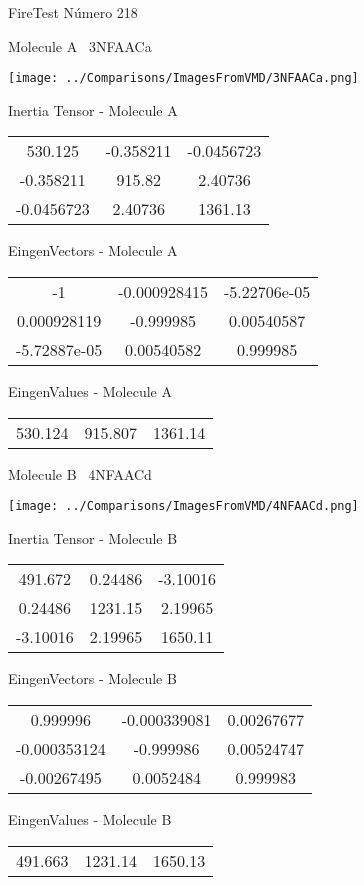 \vtab[-3cm]
\begin{center}
{\large FireTest \tab Número 218}
\end{center}
\begin{multicols}{2}
\begin{center}

Molecule A \
3NFAACa

\texttt{[image: ../Comparisons/ImagesFromVMD/3NFAACa.png]}

Inertia Tensor - Molecule A \\
\begin{tabular}{|c c c|}
530.125	 & 	-0.358211	 & 	-0.0456723	 \\
-0.358211	 & 	915.82	 & 	2.40736	 \\
-0.0456723	 & 	2.40736	 & 	1361.13
\end{tabular}

\vtab
 EingenVectors - Molecule A     \\
\begin{tabular}{|c c c|}
-1	 & 	-0.000928415	 & 	-5.22706e-05	 \\
0.000928119	 & 	-0.999985	 & 	0.00540587	 \\
-5.72887e-05	 & 	0.00540582	 & 	0.999985
\end{tabular}

\vtab
 EingenValues - Molecule A     \\
\begin{tabular}{|c c c|}
530.124	 & 	915.807	 & 	1361.14	 \\
\end{tabular}
\columnbreak

Molecule B \
4NFAACd

\texttt{[image: ../Comparisons/ImagesFromVMD/4NFAACd.png]}

Inertia Tensor - Molecule B \\
\begin{tabular}{|c c c|}
491.672	 & 	0.24486	 & 	-3.10016	 \\
0.24486	 & 	1231.15	 & 	2.19965	 \\
-3.10016	 & 	2.19965	 & 	1650.11
\end{tabular}

\vtab
 EingenVectors - Molecule B     \\
\begin{tabular}{|c c c|}
0.999996	 & 	-0.000339081	 & 	0.00267677	 \\
-0.000353124	 & 	-0.999986	 & 	0.00524747	 \\
-0.00267495	 & 	0.0052484	 & 	0.999983
\end{tabular}

\vtab
 EingenValues - Molecule B     \\
\begin{tabular}{|c c c|}
491.663	 & 	1231.14	 & 	1650.13	 \\
\end{tabular}

\end{center}
\end{multicols}

